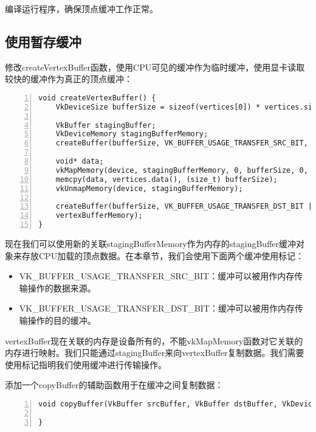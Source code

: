 \documentclass{ctexart}
\begin{document}
编译运行程序，确保顶点缓冲工作正常。

\subsection{使用暂存缓冲}

修改createVertexBuffer函数，使用CPU可见的缓冲作为临时缓冲，使用显卡读取较快的缓冲作为真正的顶点缓冲：

\begin{lstlisting}[language={[ANSI]C},keywordstyle=\color{blue!70},commentstyle=\color{red!50!green!50!blue!50},frame=shadowbox, rulesepcolor=\color{red!20!green!20!blue!20},basicstyle=\small,numbers=left, numberstyle=\tiny,breaklines=true]
void createVertexBuffer() {
	VkDeviceSize bufferSize = sizeof(vertices[0]) * vertices.size();

	VkBuffer stagingBuffer;
	VkDeviceMemory stagingBufferMemory;
	createBuffer(bufferSize, VK_BUFFER_USAGE_TRANSFER_SRC_BIT, VK_MEMORY_PROPERTY_HOST_VISIBLE_BIT | VK_MEMORY_PROPERTY_HOST_COHERENT_BIT, stagingBuffer, stagingBufferMemory);

	void* data;
	vkMapMemory(device, stagingBufferMemory, 0, bufferSize, 0, &data);
	memcpy(data, vertices.data(), (size_t) bufferSize);
	vkUnmapMemory(device, stagingBufferMemory);

	createBuffer(bufferSize, VK_BUFFER_USAGE_TRANSFER_DST_BIT | VK_BUFFER_USAGE_VERTEX_BUFFER_BIT, VK_MEMORY_PROPERTY_DEVICE_LOCAL_BIT, vertexBuffer,
	vertexBufferMemory);
}
\end{lstlisting}

现在我们可以使用新的关联stagingBufferMemory作为内存的stagingBuffer缓冲对象来存放CPU加载的顶点数据。在本章节，我们会使用下面两个缓冲使用标记：

\begin{itemize}
	\item VK\_BUFFER\_USAGE\_TRANSFER\_SRC\_BIT：缓冲可以被用作内存传输操作的数据来源。
	\item VK\_BUFFER\_USAGE\_TRANSFER\_DST\_BIT：缓冲可以被用作内存传输操作的目的缓冲。
\end{itemize}

vertexBuffer现在关联的内存是设备所有的，不能vkMapMemory函数对它关联的内存进行映射。我们只能通过stagingBuffer来向vertexBuffer复制数据。我们需要使用标记指明我们使用缓冲进行传输操作。

添加一个copyBuffer的辅助函数用于在缓冲之间复制数据：

\begin{lstlisting}[language={[ANSI]C},keywordstyle=\color{blue!70},commentstyle=\color{red!50!green!50!blue!50},frame=shadowbox, rulesepcolor=\color{red!20!green!20!blue!20},basicstyle=\small,numbers=left, numberstyle=\tiny,breaklines=true]
void copyBuffer(VkBuffer srcBuffer, VkBuffer dstBuffer, VkDeviceSize size) {

}
\end{lstlisting}
\end{document}
